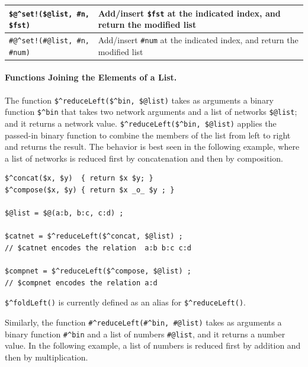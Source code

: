 \documentclass[letterpaper,12pt]{article}
\begin{document}
\vspace{.5cm}

\noindent
\begin{tabular}{|l|p{5.5cm}|}
\hline
\verb+$@^set!($@list, #n, $fst)+ & Add/insert \verb!$fst! at the indicated index, and return the
modified list\\
\hline
\verb+#@^set!(#@list, #n, #num)+ & Add/insert \verb!#num! at the indicated index, and return the
modified list\\
\hline
\end{tabular}

\vspace{.5cm}

\paragraph{Functions Joining the Elements of a List.}

The function 
\verb!$^reduceLeft($^bin, $@list)! takes as arguments a binary function
\verb!$^bin! that takes two network arguments and a list of networks
\verb!$@list!; and it returns a network value.
\verb!$^reduceLeft($^bin, $@list)!  
applies the passed-in binary function to combine the members of
the list from left to right and returns the result.  The behavior is best
seen in the following example, where a list of networks is reduced first
by concatenation and then by composition.

\begin{samepage}
\begin{Verbatim}[fontsize=\small]
$^concat($x, $y)  { return $x $y; }
$^compose($x, $y) { return $x _o_ $y ; }

$@list = $@(a:b, b:c, c:d) ;

$catnet = $^reduceLeft($^concat, $@list) ;
// $catnet encodes the relation  a:b b:c c:d

$compnet = $^reduceLeft($^compose, $@list) ;
// $compnet encodes the relation a:d
\end{Verbatim}

\noindent
\verb!$^foldLeft()! is currently defined as an alias for \verb!$^reduceLeft()!.
\end{samepage}

Similarly, the function 
\verb!#^reduceLeft(#^bin, #@list)! 
takes as arguments 
a binary function \verb!#^bin! and
a list of numbers \verb!#@list!,
and it returns a number value.  In
the following example, a list of numbers is reduced first by addition and then by
multiplication.
\end{document}
